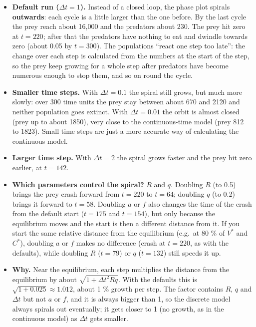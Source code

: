 \documentclass[
  a4paper]{book}
\providecommand{\tightlist}{%
  \setlength{\itemsep}{0pt}\setlength{\parskip}{0pt}}
\begin{document}
\begin{itemize}
\tightlist
\item
  \textbf{Default run (\(\Delta t = 1\)).} Instead of a closed loop, the phase plot spirals \textbf{outwards}: each cycle is a little larger than the one before. By the last cycle the prey reach about 16,000 and the predators about 230. The prey hit zero at \(t = 220\); after that the predators have nothing to eat and dwindle towards zero (about 0.05 by \(t = 300\)). The populations ``react one step too late'': the change over each step is calculated from the numbers at the start of the step, so the prey keep growing for a whole step after predators have become numerous enough to stop them, and so on round the cycle.
\item
  \textbf{Smaller time steps.} With \(\Delta t = 0.1\) the spiral still grows, but much more slowly: over 300 time units the prey stay between about 670 and 2120 and neither population goes extinct. With \(\Delta t = 0.01\) the orbit is almost closed (prey up to about 1850), very close to the continuous-time model (prey 812 to 1823). Small time steps are just a more accurate way of calculating the continuous model.
\item
  \textbf{Larger time step.} With \(\Delta t = 2\) the spiral grows faster and the prey hit zero earlier, at \(t = 142\).
\item
  \textbf{Which parameters control the spiral?} \(R\) and \(q\). Doubling \(R\) (to 0.5) brings the prey crash forward from \(t = 220\) to \(t = 64\); doubling \(q\) (to 0.2) brings it forward to \(t = 58\). Doubling \(a\) or \(f\) also changes the time of the crash from the default start (\(t = 175\) and \(t = 154\)), but only because the equilibrium moves and the start is then a different distance from it. If you start the same relative distance from the equilibrium (e.g.~at 80 \% of \(V^*\) and \(C^*\)), doubling \(a\) or \(f\) makes no difference (crash at \(t = 220\), as with the defaults), while doubling \(R\) (\(t = 79\)) or \(q\) (\(t = 132\)) still speeds it up.
\item
  \textbf{Why.} Near the equilibrium, each step multiplies the distance from the equilibrium by about \(\sqrt{1 + \Delta t^2 R q}\). With the defaults this is \(\sqrt{1 + 0.025} \approx 1.012\), about 1 \% growth per step. The factor contains \(R\), \(q\) and \(\Delta t\) but not \(a\) or \(f\), and it is always bigger than 1, so the discrete model always spirals out eventually; it gets closer to 1 (no growth, as in the continuous model) as \(\Delta t\) gets smaller.
\end{itemize}
\end{document}
